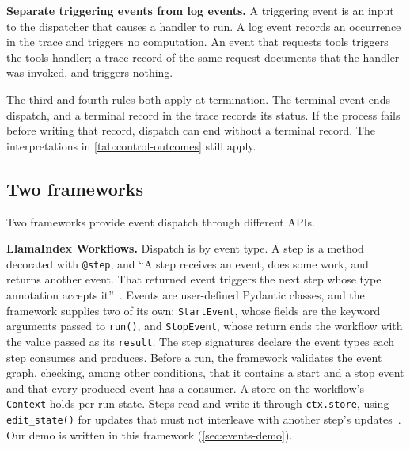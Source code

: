 \item \textbf{Separate triggering events from log events.} A triggering event is an input to the
dispatcher that causes a handler to run. A log event records an occurrence in the trace and
triggers no computation. An event that requests tools triggers the tools handler; a trace
record of the same request documents that the handler was invoked, and triggers nothing.

\ei

The third and fourth rules both apply at termination. The terminal event ends dispatch, and a
terminal record in the trace records its status. If the process fails before writing that record,
dispatch can end without a terminal record. The interpretations in \cref{tab:control-outcomes}
still apply.

\subsection{Two frameworks}
\label{sec:events-frameworks}

Two frameworks provide event dispatch through different APIs.

\bi

\item \textbf{LlamaIndex Workflows.} Dispatch is by event type. A step is a method decorated with
\texttt{@step}, and ``A step receives an event, does some work, and returns another event. That
returned event triggers the next step whose type annotation accepts it''~\citep{llamaindex-workflows}.
Events are user-defined Pydantic classes, and the framework supplies two of its own:
\texttt{StartEvent}, whose fields are the keyword arguments passed to \texttt{run()}, and
\texttt{StopEvent}, whose return ends the workflow with the value passed as its \texttt{result}.
The step signatures declare the event types each step consumes and produces. Before a run, the
framework validates the event graph, checking, among other conditions, that it contains a start
and a stop event and that every produced event has a consumer. A store on the workflow's
\texttt{Context} holds per-run state. Steps read and write it through \texttt{ctx.store}, using
\texttt{edit\_state()} for updates that must not interleave with another step's
updates~\citep{llamaindex-workflows-state}. Our demo is written in this
framework (\cref{sec:events-demo}).

